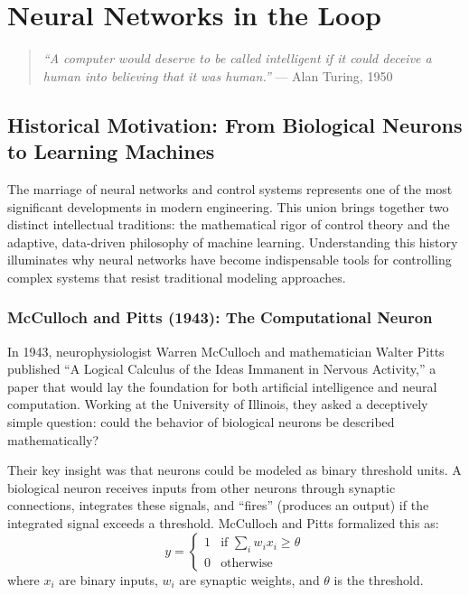 
\chapter{Neural Networks in the Loop}
\label{ch:neural_networks}

\begin{quote}
\textit{``A computer would deserve to be called intelligent if it could deceive a human into believing that it was human.''} --- Alan Turing, 1950
\end{quote}

\section{Historical Motivation: From Biological Neurons to Learning Machines}

The marriage of neural networks and control systems represents one of the most significant developments in modern engineering. This union brings together two distinct intellectual traditions: the mathematical rigor of control theory and the adaptive, data-driven philosophy of machine learning. Understanding this history illuminates why neural networks have become indispensable tools for controlling complex systems that resist traditional modeling approaches.

\subsection{McCulloch and Pitts (1943): The Computational Neuron}

In 1943, neurophysiologist Warren McCulloch and mathematician Walter Pitts published ``A Logical Calculus of the Ideas Immanent in Nervous Activity,'' a paper that would lay the foundation for both artificial intelligence and neural computation. Working at the University of Illinois, they asked a deceptively simple question: could the behavior of biological neurons be described mathematically?

Their key insight was that neurons could be modeled as binary threshold units. A biological neuron receives inputs from other neurons through synaptic connections, integrates these signals, and ``fires'' (produces an output) if the integrated signal exceeds a threshold. McCulloch and Pitts formalized this as:
\begin{equation}
y = \begin{cases} 1 & \text{if } \sum_{i} w_i x_i \geq \theta \\ 0 & \text{otherwise} \end{cases}
\label{eq:mcculloch_pitts}
\end{equation}
where $x_i$ are binary inputs, $w_i$ are synaptic weights, and $\theta$ is the threshold.

